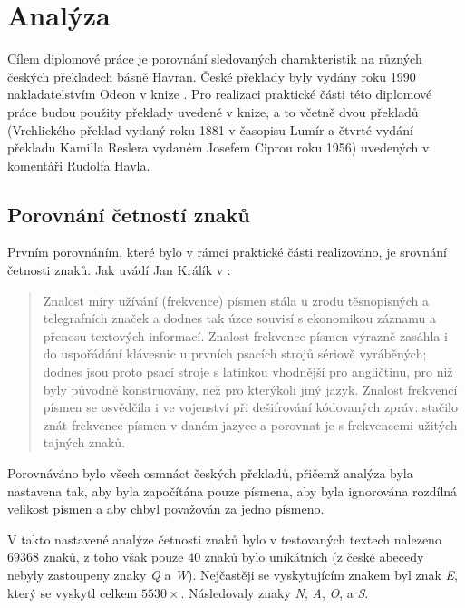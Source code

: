 \documentclass[dp.tex]{subfiles}
\begin{document}
\chapter{Analýza}
\label{chap:experiment} 

Cílem diplomové práce je porovnání sledovaných charakteristik na různých českých překladech básně Havran. České překlady byly vydány roku 1990 nakladatelstvím Odeon v knize . Pro realizaci praktické části této diplomové práce budou použity překlady uvedené v knize, a to včetně dvou překladů (Vrchlického překlad vydaný roku 1881 v časopisu Lumír a čtvrté vydání překladu Kamilla Reslera vydaném Josefem Ciprou roku 1956) uvedených v komentáři Rudolfa Havla.

\section{Porovnání četností znaků}

Prvním porovnáním, které bylo v rámci praktické části realizováno, je srovnání četnosti znaků. Jak uvádí Jan Králík v \cite[str.~109]{Tesitelova1987}: 

\begin{quote}
Znalost míry užívání (frekvence) písmen stála u zrodu těsnopisných a telegrafních značek a dodnes tak úzce souvisí s ekonomikou záznamu a přenosu textových informací. Znalost frekvence písmen výrazně zasáhla i do uspořádání klávesnic u prvních psacích strojů sériově vyráběných; dodnes jsou proto psací stroje s latinkou vhodnější pro angličtinu, pro niž byly původně konstruovány, než pro kterýkoli jiný jazyk. Znalost frekvencí písmen se osvědčila i ve vojenství při dešifrování kódovaných zpráv: stačilo znát frekvence písmen v daném jazyce a porovnat je s frekvencemi užitých \clq tajných znaků\crq.
\end{quote}

Porovnáváno bylo všech osmnáct českých překladů, přičemž analýza byla nastavena tak, aby byla započítána pouze písmena, aby byla ignorována rozdílná velikost písmen a aby  \clq ch\crq byl považován za jedno písmeno.

V takto nastavené analýze četnosti znaků bylo v testovaných textech nalezeno $69 368$ znaků, z toho však pouze $40$ znaků bylo unikátních (z české abecedy nebyly zastoupeny znaky \textit{Q} a \textit{W}). Nejčastěji se vyskytujícím znakem byl znak \textit{E}, který se vyskytl celkem $5530\times$. Následovaly znaky \textit{N}, \textit{A}, \textit{O}, a \textit{S}.
\end{document}
